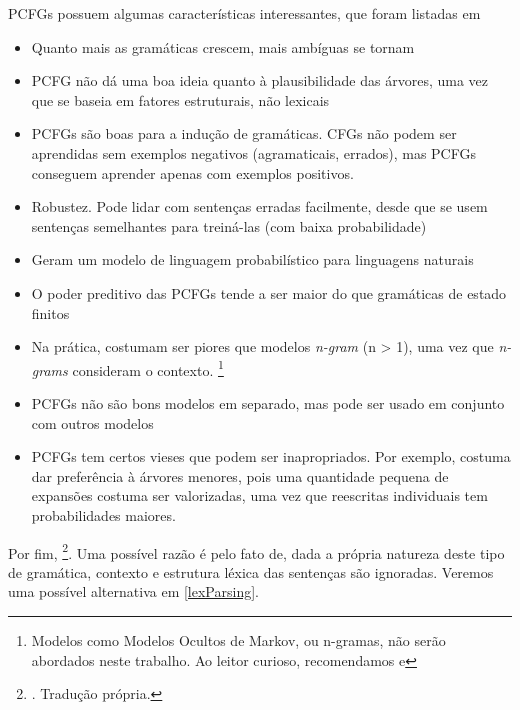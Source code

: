 PCFGs possuem algumas características interessantes, que foram listadas em \cite[p~386-388]{Manning1999FoundationsNLP}
\begin{itemize}
    \item Quanto mais as gramáticas crescem, mais ambíguas se tornam
    \item PCFG não dá uma boa ideia quanto à plausibilidade das árvores, uma vez que se baseia em fatores estruturais, não lexicais
    \item PCFGs são boas para a indução de gramáticas.  CFGs não podem ser aprendidas sem exemplos negativos (agramaticais, errados), mas PCFGs conseguem aprender apenas com exemplos positivos. 
    \item Robustez. Pode lidar com sentenças erradas facilmente, desde que se usem sentenças semelhantes para treiná-las (com baixa probabilidade)
    \item Geram um modelo de linguagem probabilístico para linguagens naturais
    \item O poder preditivo das PCFGs tende a ser maior do que gramáticas de estado finitos
    \item Na prática, costumam ser piores que modelos \textit{n-gram} (n > 1), uma vez que \textit{n-grams} consideram o contexto.
    \footnote{Modelos como Modelos Ocultos de Markov, ou n-gramas, não serão abordados neste trabalho. Ao leitor curioso, recomendamos \cite[p~191]{Manning1999FoundationsNLP} e }
    \item PCFGs não são bons modelos em separado, mas pode ser usado em conjunto com outros modelos
    \item PCFGs tem certos vieses que podem ser inapropriados. Por exemplo, costuma dar preferência à árvores menores, pois uma quantidade pequena de expansões costuma ser valorizadas, uma vez que reescritas individuais tem probabilidades maiores.
\end{itemize}

Por fim,  
\footnote{. Tradução própria.}. Uma possível razão é pelo fato de, dada a própria natureza deste tipo de gramática, contexto e estrutura léxica das sentenças são ignoradas. Veremos uma possível alternativa em \ref{lexParsing}.

